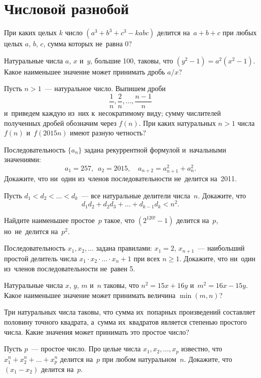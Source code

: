 
\section*{Числовой разнобой}


\begin{problems}

\item
При каких целых $k$ число $(a^3 + b^3 + c^3 - k a b c)$ делится на~$a + b + c$
при любых целых $a$, $b$, $c$, сумма которых не~равна 0?

\item
Натуральные числа $a$, $x$ и~$y$, большие 100, таковы, что
$(y^2 - 1) = a^2 (x^2 - 1)$.
Какое наименьшее значение может принимать дробь $a / x$?

\item
Пусть $n > 1$~--- натуральное число.
Выпишем дроби
\[
    \frac{1}{n}, \frac{2}{n}, \ldots, \frac{n - 1}{n}
\]
и~приведем каждую из~них к~несократимому виду;
сумму числителей полученных дробей обозначим через $f(n)$.
При каких натуральных $n > 1$ числа $f(n)$ и~$f(2015 n)$ имеют разную четность?

\item
Последовательность $\{ a_n \}$ задана рекуррентной формулой и~начальными
значениями:
\[
    a_1 = 257
,\enspace
    a_2 = 2015
,\quad
    a_{n+2} = a_{n+1}^2 + a_n^2
.\]
Докажите, что ни~один из~членов последовательности не~делится на~2011.

\item
Пусть $d_1 < d_2 < \ldots < d_k$~--- все натуральные делители числа~$n$.
Докажите, что
\[
    d_1 d_2 + d_2 d_3 + \ldots + d_{k-1} d_k < n^2
.\]

\item
Найдите наименьшее простое~$p$ такое, что $(2^{120!} - 1)$ делится на~$p$,
но~не~делится на~$p^2$.

\item
Последовательность $x_1, x_2, \ldots$ задана правилами: $x_1 = 2$,
$x_{n+1}$~--- наибольший простой делитель числа
\(
    x_1 \cdot x_2 \cdot \ldots \cdot x_{n} + 1
\)
при всех $n \geq 1$.
Докажите, что ни~один из~членов последовательности не~равен 5.

\item
Натуральные числа $x$, $y$, $m$ и~$n$ таковы, что
$n^2 = 15 x + 16 y$ и~$m^2 = 16 x - 15 y$.
Какое наименьшее значение может принимать величина $\min (m, n)$?

\item
Три натуральных числа таковы, что сумма их~попарных произведений составляет
половину точного квадрата, а~сумма их~квадратов является степенью простого
числа.
Какие значения может принимать это простое число?

\item
Пусть $p$~--- простое число.
Про целые числа $x_1, x_2, \ldots, x_p$ известно, что
$x_1^n + x_2^n + \ldots + x_p^n$ делится на~$p$ при любом натуральном~$n$.
Докажите, что $(x_1 - x_2)$ делится на~$p$.

\end{problems}


